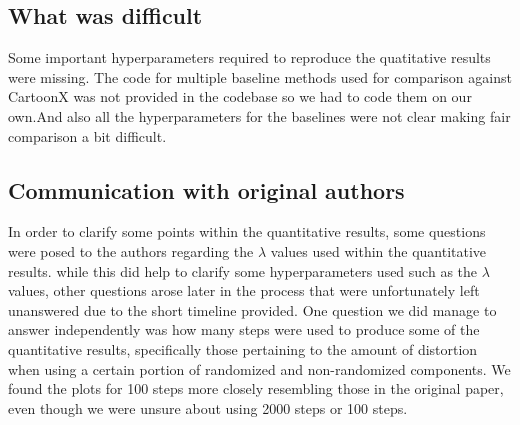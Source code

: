 \subsection{What was difficult}
Some important hyperparameters required to reproduce the quatitative results were missing. The code for multiple baseline methods used for comparison against CartoonX was not provided in the codebase so we had to code them on our own.And also all the hyperparameters for the baselines were not clear making fair comparison a bit difficult. 

\subsection{Communication with original authors}
In order to clarify some points within the quantitative results, some questions were posed to the authors regarding the $\lambda$ values used within the quantitative results. while this did help to clarify some hyperparameters used such as the $\lambda$ values, other questions arose later in the process that were unfortunately left unanswered due to the short timeline provided. One question we did manage to answer independently was how many steps were used to produce some of the quantitative results, specifically those pertaining to the amount of distortion when using a certain portion of randomized and non-randomized components. We found the plots for 100 steps more closely resembling those in the original paper, even though we were unsure about using 2000 steps or 100 steps. 